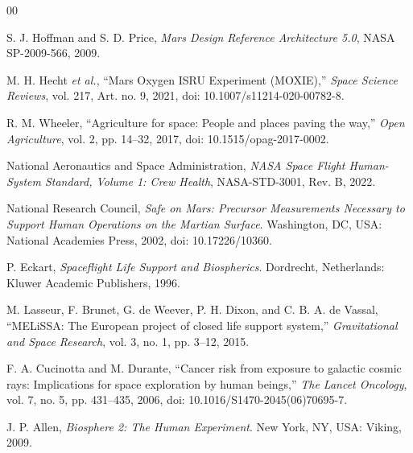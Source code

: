 \documentclass[10pt,conference]{IEEEtran}
\begin{document}
\begin{thebibliography}{00}

S. J. Hoffman and S. D. Price, \emph{Mars Design Reference Architecture 5.0}, NASA SP-2009-566, 2009.

M. H. Hecht \emph{et al.}, ``Mars Oxygen ISRU Experiment (MOXIE),'' \emph{Space Science Reviews}, vol. 217, Art. no. 9, 2021, doi: 10.1007/s11214-020-00782-8.

R. M. Wheeler, ``Agriculture for space: People and places paving the way,'' \emph{Open Agriculture}, vol. 2, pp. 14--32, 2017, doi: 10.1515/opag-2017-0002.

National Aeronautics and Space Administration, \emph{NASA Space Flight Human-System Standard, Volume 1: Crew Health}, NASA-STD-3001, Rev. B, 2022.

National Research Council, \emph{Safe on Mars: Precursor Measurements Necessary to Support Human Operations on the Martian Surface}. Washington, DC, USA: National Academies Press, 2002, doi: 10.17226/10360.

P. Eckart, \emph{Spaceflight Life Support and Biospherics}. Dordrecht, Netherlands: Kluwer Academic Publishers, 1996.

M. Lasseur, F. Brunet, G. de Weever, P. H. Dixon, and C. B. A. de Vassal, ``MELiSSA: The European project of closed life support system,'' \emph{Gravitational and Space Research}, vol. 3, no. 1, pp. 3--12, 2015.

F. A. Cucinotta and M. Durante, ``Cancer risk from exposure to galactic cosmic rays: Implications for space exploration by human beings,'' \emph{The Lancet Oncology}, vol. 7, no. 5, pp. 431--435, 2006, doi: 10.1016/S1470-2045(06)70695-7.

J. P. Allen, \emph{Biosphere 2: The Human Experiment}. New York, NY, USA: Viking, 2009.

\end{thebibliography}
\end{document}
